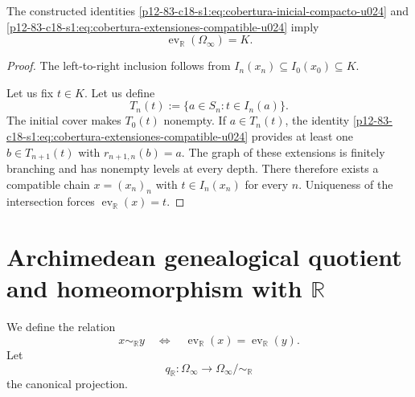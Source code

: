 \begin{theorem}
\label{p12-83-c18-s1:thm:sobreyectividad-evaluacion-compacto}
The constructed identities
\eqref{p12-83-c18-s1:eq:cobertura-inicial-compacto-u024} and
\eqref{p12-83-c18-s1:eq:cobertura-extensiones-compatible-u024} imply
\begin{equation}
 \operatorname{ev}_{\mathbb R}(\Omega_\infty)=K.
 \label{p12-83-c18-s1:eq:imagen-evaluacion-compacto}
\end{equation}
\end{theorem}

\begin{proof}
The left-to-right inclusion follows from
\(I_n(x_n)\subseteq I_0(x_0)\subseteq K\).

Let us fix \(t\in K\). Let us define
\begin{equation}
 T_n(t):=\{a\in S_n:t\in I_n(a)\}.
 \label{p12-83-c18-s1:eq:estados-que-cubren-punto}
\end{equation}
The initial cover makes \(T_0(t)\) nonempty. If \(a\in T_n(t)\), the identity \eqref{p12-83-c18-s1:eq:cobertura-extensiones-compatible-u024} provides at least one \(b\in T_{n+1}(t)\) with \(r_{n+1,n}(b)=a\). The graph of these extensions is finitely branching and has nonempty levels at every depth. There therefore exists a compatible chain \(x=(x_n)_n\) with \(t\in I_n(x_n)\) for every \(n\). Uniqueness of the intersection forces \(\operatorname{ev}_{\mathbb R}(x)=t\).
\end{proof}

\section{Archimedean genealogical quotient and homeomorphism with \texorpdfstring{\(\mathbb R\)}{R}}

We define the relation
\begin{equation}
 x\sim_{\mathbb R}y
 \quad\Longleftrightarrow\quad
 \operatorname{ev}_{\mathbb R}(x)
 =\operatorname{ev}_{\mathbb R}(y).
 \label{p12-83-c18-s1:eq:relacion-equivalencia-arquimediana}
\end{equation}
Let
\begin{equation}
 q_{\mathbb R}:\Omega_\infty
 \longrightarrow\Omega_\infty/\!\sim_{\mathbb R}
 \label{p12-83-c18-s1:eq:proyeccion-cociente-arquimediano}
\end{equation}
the canonical projection.

